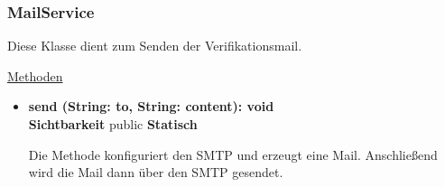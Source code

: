 \subsubsection{MailService}\label{MailService}
Diese Klasse dient zum Senden der Verifikationsmail. \newline


\underline{Methoden}
\begin{itemize}
\itemsep0pt
\item \textbf{send (String: to, String: content): void}\hfill\\
\textbf{Sichtbarkeit} public \newline
\textbf{Statisch}

Die Methode konfiguriert den SMTP und erzeugt eine Mail. Anschließend wird die Mail dann über den SMTP gesendet.

\end{itemize}
